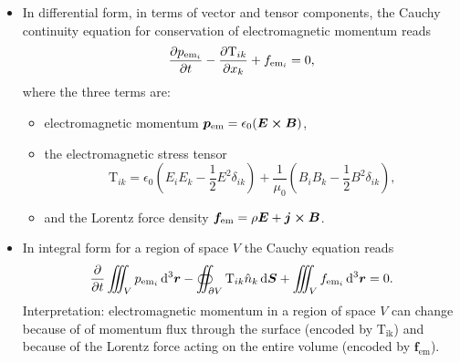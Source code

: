 \documentclass[11pt, a4paper]{article}
\newcommand{\diff}{\mathop{}\!\mathrm{d}} %
\newcommand{\dr}{\diff^{3} \r}  %
\renewcommand{\vec}[1]{\bm{#1}} %
\renewcommand{\r}{\vec{r}}
\newcommand{\E}{\vec{E}} %
\newcommand{\B}{\vec{B}} %
\newcommand{\TT}{\mathrm{T}}  %
\newcommand{\ee}{\epsilon_{0}}  %
\newcommand{\mm}{\mu_{0}}  %
\renewcommand{\j}{\vec{j}}  %
\begin{document}
\begin{itemize}
    \item In differential form, in terms of vector and tensor components, the Cauchy continuity equation for conservation of electromagnetic momentum reads
    \begin{equation*}
        \pdv{p_{\text{em}_{i}}}{t} - \pdv{\TT_{ik}}{x_{k}} + f_{\text{em}_{i}} = 0,
    \end{equation*}
    where the three terms are:
    \begin{itemize}
        \item electromagnetic momentum $ \vec{p}_{\text{em}} = \ee (\E \cross \B) $,

        \item the electromagnetic stress tensor 
        \begin{equation*}
            \TT_{ik} = \ee \left(E_{i}E_{k} - \frac{1}{2}E^{2}\delta_{ik}\right) + \frac{1}{\mm}\left(B_{i}B_{k} - \frac{1}{2}B^{2}\delta_{ik}\right),
        \end{equation*}
        
        \item and the Lorentz force density $ \vec{f}_{\text{em}} = \rho \E + \j \cross \B $.
    \end{itemize}
    
    \item In integral form for a region of space $ V $ the Cauchy equation reads
    \begin{equation*}
        \pdv{t} \iiint_{V} p_{\text{em}_{i}} \dr - \oiint_{\partial V} \TT_{ik}\hat{n}_{k}\diff \vec{S} + \iiint_{V}f_{\text{em}_{i}}\dr = 0.
    \end{equation*}
	Interpretation: electromagnetic momentum in a region of space $ V $ can change because of of momentum flux through the surface (encoded by $ \TT_{\text{ik}} $) and because of the Lorentz force acting on the entire volume (encoded by $ \vec{f}_{\text{em}} $). 
    
    
    
\end{itemize}
\end{document}
